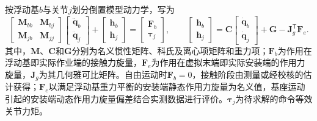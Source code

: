 \documentclass[UTF8,a4paper,zihao=-4,fontset=fandol]{ctexart}
\begin{document}
按浮动基$b$与关节$j$划分倒置模型动力学，写为
\begin{equation}
 \begin{bmatrix}\bm M_{bb}&\bm M_{bj}\\\bm M_{jb}&\bm M_{jj}\end{bmatrix}
 \begin{bmatrix}\ddot{\bm q}_b\\\ddot{\bm q}_j\end{bmatrix}
 +\begin{bmatrix}\bm h_b\\\bm h_j\end{bmatrix}
 =\begin{bmatrix}\bm F_b\\\bm\tau_j\end{bmatrix},
 \qquad
 \begin{bmatrix}\bm h_b\\\bm h_j\end{bmatrix}
 =\bm C\begin{bmatrix}\dot{\bm q}_b\\\dot{\bm q}_j\end{bmatrix}
  +\bm G-\bm J_g^{\mathsf T}\bm F_e .
\label{eq:partitioned_dynamics}
\end{equation}
其中，$\bm M$、$\bm C$和$\bm G$分别为名义惯性矩阵、科氏及离心项矩阵和重力项；$\bm F_b$为作用在浮动基即实际作业端的接触力旋量，$\bm F_e$为作用在虚拟末端即实际安装端的作用力旋量，$\bm J_g$为其几何雅可比矩阵。自由运动时$\bm F_b=0$，接触阶段由测量或经校核的估计获得；$\bm F_e$以满足浮动基重力平衡的安装端静态作用力旋量为名义值，基座运动引起的安装端动态作用力旋量偏差结合实测数据进行评价。$\bm\tau_j$为待求解的命令等效关节力矩。
\end{document}
